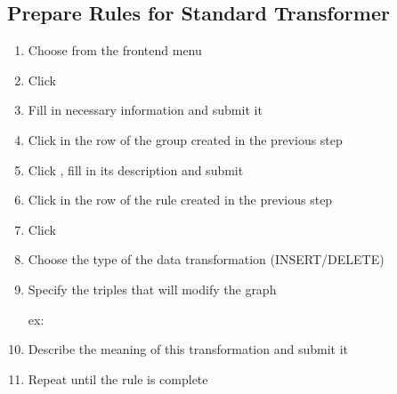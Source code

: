 \subsection*{Prepare Rules for Standard Transformer}
\begin{enumerate}[resume]
	\item Choose  from the frontend menu
	\item Click 
	\item Fill in necessary information and submit it
	\item Click  in the row of the group created in the previous step
	\item Click , fill in its description and submit
	\item Click  in the row of the rule created in the previous step
	\item Click 
	\item Choose the type of the data transformation (INSERT/DELETE)
	\item Specify the triples that will modify the graph
	
	ex: 
	
	\item Describe the meaning of this transformation and submit it
	\item Repeat until the rule is complete
\end{enumerate}

  

